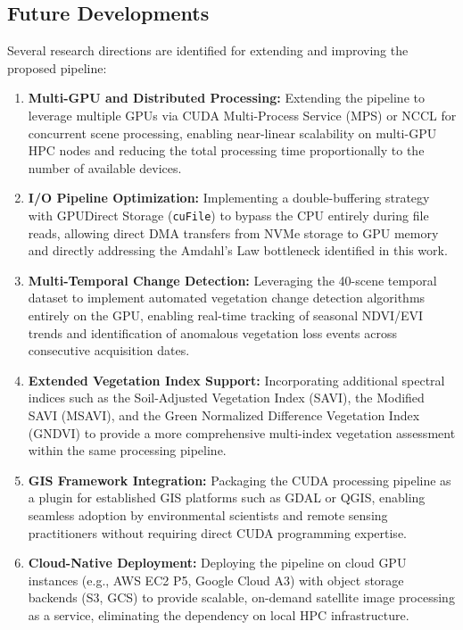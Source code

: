 \documentclass[10pt,conference,compsoc]{IEEEtran}
\begin{document}
\subsection{Future Developments}
Several research directions are identified for extending and improving the proposed pipeline:
\begin{enumerate}
    \item \textbf{Multi-GPU and Distributed Processing:} Extending the pipeline to leverage multiple GPUs via CUDA Multi-Process Service (MPS) or NCCL for concurrent scene processing, enabling near-linear scalability on multi-GPU HPC nodes and reducing the total processing time proportionally to the number of available devices.
    \item \textbf{I/O Pipeline Optimization:} Implementing a double-buffering strategy with GPUDirect Storage (\texttt{cuFile}) to bypass the CPU entirely during file reads, allowing direct DMA transfers from NVMe storage to GPU memory and directly addressing the Amdahl's Law bottleneck identified in this work.
    \item \textbf{Multi-Temporal Change Detection:} Leveraging the 40-scene temporal dataset to implement automated vegetation change detection algorithms entirely on the GPU, enabling real-time tracking of seasonal NDVI/EVI trends and identification of anomalous vegetation loss events across consecutive acquisition dates.
    \item \textbf{Extended Vegetation Index Support:} Incorporating additional spectral indices such as the Soil-Adjusted Vegetation Index (SAVI), the Modified SAVI (MSAVI), and the Green Normalized Difference Vegetation Index (GNDVI) to provide a more comprehensive multi-index vegetation assessment within the same processing pipeline.
    \item \textbf{GIS Framework Integration:} Packaging the CUDA processing pipeline as a plugin for established GIS platforms such as GDAL or QGIS, enabling seamless adoption by environmental scientists and remote sensing practitioners without requiring direct CUDA programming expertise.
    \item \textbf{Cloud-Native Deployment:} Deploying the pipeline on cloud GPU instances (e.g., AWS EC2 P5, Google Cloud A3) with object storage backends (S3, GCS) to provide scalable, on-demand satellite image processing as a service, eliminating the dependency on local HPC infrastructure.
\end{enumerate}
\end{document}
